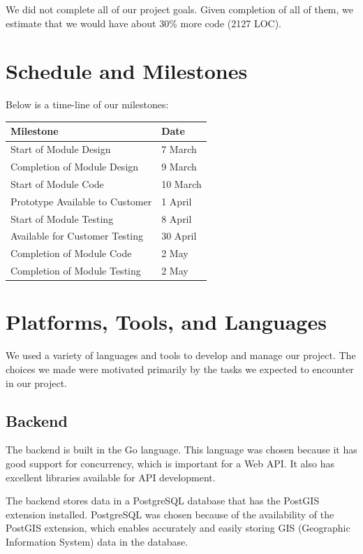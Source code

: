 \documentclass{article}
\begin{document}
We did not complete all of our project goals. Given completion of all of them, we estimate that we would have about 30\% more code (2127 LOC).

\section{Schedule and Milestones}

Below is a time-line of our milestones:

\begin{center}
  \begin{tabular}{l|l}
    Milestone & Date \\
    \hline
    Start of Module Design & 7 March \\
    Completion of Module Design & 9 March \\
    Start of Module Code & 10 March \\
    Prototype Available to Customer & 1 April \\
    Start of Module Testing & 8 April \\
    Available for Customer Testing & 30 April \\
    Completion of Module Code & 2 May \\
    Completion of Module Testing & 2 May
  \end{tabular}
\end{center}

\section{Platforms, Tools, and Languages}

We used a variety of languages and tools to develop and manage our project. The
choices we made were motivated primarily by the tasks we expected to encounter
in our project.

\subsection{Backend}

The backend is built in the Go language. This language was chosen because it
has good support for concurrency, which is important for a Web API. It also has
excellent libraries available for API development.

The backend stores data in a PostgreSQL database that has the PostGIS extension
installed. PostgreSQL was chosen because of the availability of the PostGIS
extension, which enables accurately and easily storing GIS (Geographic
Information System) data in the database.
\end{document}
